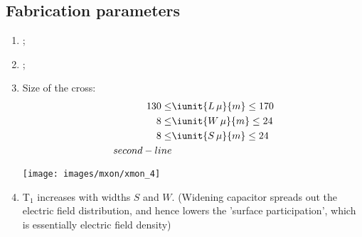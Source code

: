 \begin{framed}
\subsection{Fabrication parameters}\label{sec:fabr-param}
\begin{enumerate}
\item {}\ec;
\item {}\ec;
\item Size of the cross:
  \begin{equation}
    \label{eq:images/mxon/xmon_cross}
    \begin{aligned}
      130 \le & \iunit{L\,\mu}{m} \le 170 \\
      8 \le & \iunit{W\,\mu}{m} \le 24 \\
      8 \le & \iunit{S\,\mu}{m} \le 24 \\
      second-line
    \end{aligned}
  \end{equation}
  
  \begin{center}
    \texttt{[image: images/mxon/xmon\_4]}
  \end{center}

\item T$_1$  increases with  widths $  S $  and $ W  $.  (Widening  capacitor spreads  out the
  electric  field  distribution,  and  hence  lowers the  'surface  participation',  which  is
  essentially electric field density)
\end{enumerate}



  
\end{framed}
